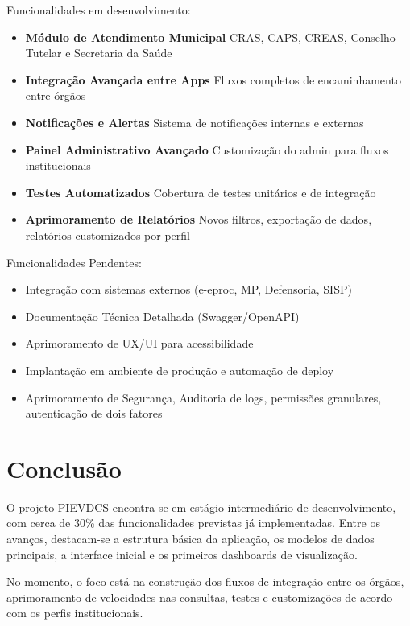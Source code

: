 Funcionalidades em desenvolvimento:
\begin{itemize}
    \item \textbf{Módulo de Atendimento Municipal} CRAS, CAPS, CREAS, Conselho Tutelar e Secretaria da Saúde
    \item \textbf{Integração Avançada entre Apps} Fluxos completos de encaminhamento entre órgãos
    \item \textbf{Notificações e Alertas} Sistema de notificações internas e externas
    \item \textbf{Painel Administrativo Avançado} Customização do admin para fluxos institucionais
    \item \textbf{Testes Automatizados} Cobertura de testes unitários e de integração
    \item \textbf{Aprimoramento de Relatórios} Novos filtros, exportação de dados, relatórios customizados por perfil

\end{itemize}

Funcionalidades Pendentes:
\begin{itemize}
    \item Integração com sistemas externos (e-eproc, MP, Defensoria, SISP)
    \item Documentação Técnica Detalhada (Swagger/OpenAPI)
    \item Aprimoramento de UX/UI para acessibilidade
    \item Implantação em ambiente de produção e automação de deploy
    \item Aprimoramento de Segurança, Auditoria de logs, permissões granulares, autenticação de dois fatores
\end{itemize}


\section{Conclusão}

\par O projeto PIEVDCS encontra-se em estágio intermediário de desenvolvimento, com cerca de 30\% das funcionalidades previstas já implementadas. Entre os avanços, destacam-se a estrutura básica da aplicação, os modelos de dados principais, a interface inicial e os primeiros dashboards de visualização.

\par No momento, o foco está na construção dos fluxos de integração entre os órgãos, aprimoramento de velocidades nas consultas, testes e customizações de acordo com os perfis institucionais.

